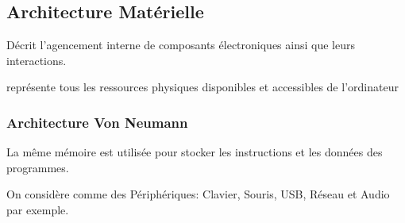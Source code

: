\documentclass{article}
\begin{document}
\subsection{Architecture Matérielle}
\begin{definition}\label{def:architectureMaterielle}
    Décrit l'agencement interne de composants électroniques ainsi que leurs interactions.

    \begin{phrase}
        représente tous les ressources physiques disponibles et accessibles de l'ordinateur
    \end{phrase}
\end{definition}
\subsubsection{Architecture Von Neumann}
\begin{definition}\label{def:architectureVonNeumann}
    La même mémoire est utilisée pour stocker les instructions et les données des programmes.

    \begin{figure}[H]
        \centering
    \end{figure}
    On considère comme des Périphériques: Clavier, Souris, USB, Réseau et Audio par exemple. 
\end{definition}
\end{document}
